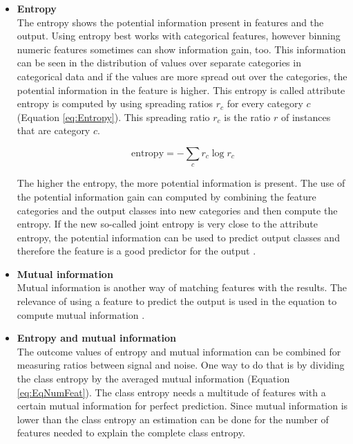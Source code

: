 \documentclass[10pt,a4paper]{report}
\begin{document}
	\begin{itemize}
		\item \textbf{Entropy} \\
		The entropy shows the potential information present in features and the output. Using entropy best works with categorical features, however binning numeric features sometimes can show information gain, too. This information can be seen in the distribution of values over separate categories in categorical data and if the values are more spread out over the categories, the potential information in the feature is higher. This entropy is called attribute entropy is computed by using spreading ratios $r_c$ for every category $c$ (Equation \ref{eq:Entropy}). This spreading ratio $r_c$ is the ratio $r$ of instances that are category $c$.
		
		\begin{equation}\label{eq:Entropy}
		\text{entropy} = - \sum_{c} r_c \log{r_c}
		\end{equation}
		
		The higher the entropy, the more potential information is present. The use of the potential information gain can computed by combining the feature categories and the output classes into new categories and then compute the entropy. If the new so-called joint entropy is very close to the attribute entropy, the potential information can be used to predict output classes and therefore the feature is a good predictor for the output \cite{agresti2003categorical}.
		
		\item \textbf{Mutual information} \\
		Mutual information is another way of matching features with the results. The relevance of using a feature to predict the output is used in the equation to compute mutual information \cite{chow1968approximating}. 
		
		\item \textbf{Entropy and mutual information} \\
		The outcome values of entropy and mutual information can be combined for measuring ratios between signal and noise. One way to do that is by dividing the class entropy by the averaged mutual information (Equation \ref{eq:EqNumFeat}). The class entropy needs a multitude of features with a certain mutual information for perfect prediction. Since mutual information is lower than the class entropy an estimation can be done for the number of features needed to explain the complete class entropy.
		

\end{itemize}
\end{document}

